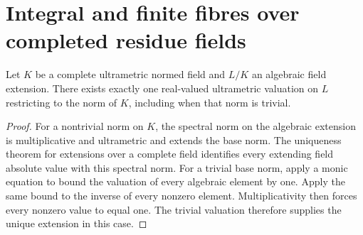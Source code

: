 \section{Integral and finite fibres over completed residue fields}
\label{sec:general-finite-fibres}

\begin{theorem}
\label{spectrum:complete-norm-extension}
\leanok
Let $K$ be a complete ultrametric normed field and $L/K$ an algebraic
field extension. There exists exactly one real-valued ultrametric
valuation on $L$ restricting to the norm of $K$, including when
that norm is trivial.
\end{theorem}
\begin{proof}
For a nontrivial norm on $K$, the spectral norm on the algebraic
extension is multiplicative and ultrametric and extends the base
norm. The uniqueness theorem for extensions over a complete field
identifies every extending field absolute value with this spectral
norm. For a trivial base norm, apply a monic equation to bound the
valuation of every algebraic element by one. Apply the same bound
to the inverse of every nonzero element. Multiplicativity then
forces every nonzero value to equal one. The trivial valuation
therefore supplies the unique extension in this case.
\end{proof}

